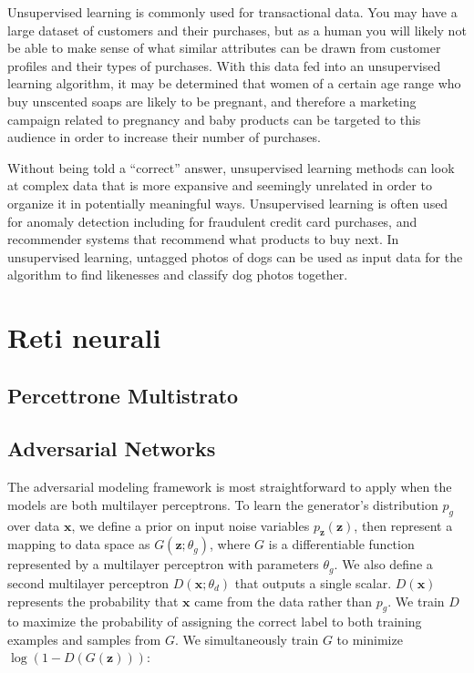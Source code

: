 Unsupervised learning is commonly used for transactional data. You may have a large dataset of customers and their purchases, but as a human you will likely not be able to make sense of what similar attributes can be drawn from customer profiles and their types of purchases. With this data fed into an unsupervised learning algorithm, it may be determined that women of a certain age range who buy unscented soaps are likely to be pregnant, and therefore a marketing campaign related to pregnancy and baby products can be targeted to this audience in order to increase their number of purchases.

Without being told a “correct” answer, unsupervised learning methods can look at complex data that is more expansive and seemingly unrelated in order to organize it in potentially meaningful ways. Unsupervised learning is often used for anomaly detection including for fraudulent credit card purchases, and recommender systems that recommend what products to buy next. In unsupervised learning, untagged photos of dogs can be used as input data for the algorithm to find likenesses and classify dog photos together.


\newpage
\section{Reti neurali}

\subsection{Percettrone Multistrato}
\subsection{Adversarial Networks}
The adversarial modeling framework is most straightforward to apply when the models are both multilayer perceptrons. To learn the generator's distribution $p_g$ over data $\bm{x}$, we
define a prior on input noise variables $p_{\bm{z}}(\bm{z})$, then represent a
mapping to data space as $G(\bm{z}; \theta_g)$, where $G$ is a differentiable function
represented by a multilayer perceptron with parameters $\theta_g$. We also define a second
multilayer perceptron $D(\bm{x}; \theta_d)$ that outputs a single scalar. $D(\bm{x})$ represents
the probability that $\bm{x}$ came from the data rather than $p_g$. We train $D$ to maximize the
probability of assigning the correct label to both training examples and samples from $G$.
We simultaneously train $G$ to minimize $\log(1-D(G(\bm{z})))$:

